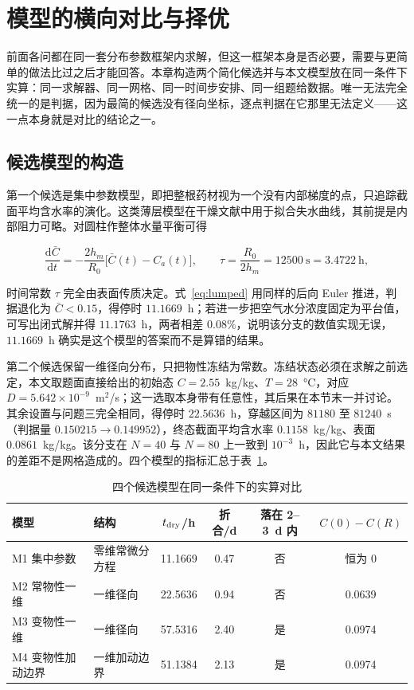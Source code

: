 \section{模型的横向对比与择优}

前面各问都在同一套分布参数框架内求解，但这一框架本身是否必要，需要与更简单的做法比过之后才能回答。本章构造两个简化候选并与本文模型放在同一条件下实算：同一求解器、同一网格、同一时间步安排、同一组题给数据。唯一无法完全统一的是判据，因为最简的候选没有径向坐标，逐点判据在它那里无法定义——这一点本身就是对比的结论之一。

\subsection{候选模型的构造}

第一个候选是集中参数模型，即把整根药材视为一个没有内部梯度的点，只追踪截面平均含水率的演化。这类薄层模型在干燥文献中用于拟合失水曲线，其前提是内部阻力可略。对圆柱作整体水量平衡可得

\begin{equation}
\frac{\mathrm{d}\bar C}{\mathrm{d}t}=-\frac{2h_m}{R_0}\big[\bar C(t)-C_a(t)\big],
\qquad
\tau=\frac{R_0}{2h_m}=12500\ \mathrm{s}=3.4722\ \mathrm{h},
\label{eq:lumped}
\end{equation}

时间常数 $\tau$ 完全由表面传质决定。式~\eqref{eq:lumped} 用同样的后向 Euler 推进，判据退化为 $\bar C<0.15$，得停时 $11.1669$~h；若进一步把空气水分浓度固定为平台值，可写出闭式解并得 $11.1763$~h，两者相差 $0.08\%$，说明该分支的数值实现无误，$11.1669$~h 确实是这个模型的答案而不是算错的结果。

第二个候选保留一维径向分布，只把物性冻结为常数。冻结状态必须在求解之前选定，本文取题面直接给出的初始态 $C=2.55$~kg/kg、$T=28$~°C，对应 $D=5.642\times10^{-9}$~m$^2$/s；这一选取本身带有任意性，其后果在本节末一并讨论。其余设置与问题三完全相同，得停时 $22.5636$~h，穿越区间为 $81180$ 至 $81240$~s（判据量 $0.150215\to0.149952$），终态截面平均含水率 $0.1158$~kg/kg、表面 $0.0861$~kg/kg。该分支在 $N=40$ 与 $N=80$ 上一致到 $10^{-3}$~h，因此它与本文结果的差距不是网格造成的。四个模型的指标汇总于表~\ref{tab:compare}。

\begin{table}[H]
\centering
\caption{四个候选模型在同一条件下的实算对比}\label{tab:compare}
\setlength{\tabcolsep}{4pt}
\begin{tabular}{llcccc}
\toprule
模型 & 结构 & $t_{\rm dry}$/h & 折合/d & 落在 2--3~d 内 & $C(0)-C(R)$ \\
\midrule
M1 集中参数     & 零维常微分方程 & 11.1669 & 0.47 & 否 & 恒为 $0$ \\
M2 常物性一维   & 一维径向       & 22.5636 & 0.94 & 否 & 0.0639 \\
M3 变物性一维   & 一维径向       & 57.5316 & 2.40 & 是 & 0.0974 \\
M4 变物性加动边界 & 一维加动边界 & 51.1384 & 2.13 & 是 & 0.0974 \\
\bottomrule
\end{tabular}
\end{table}

